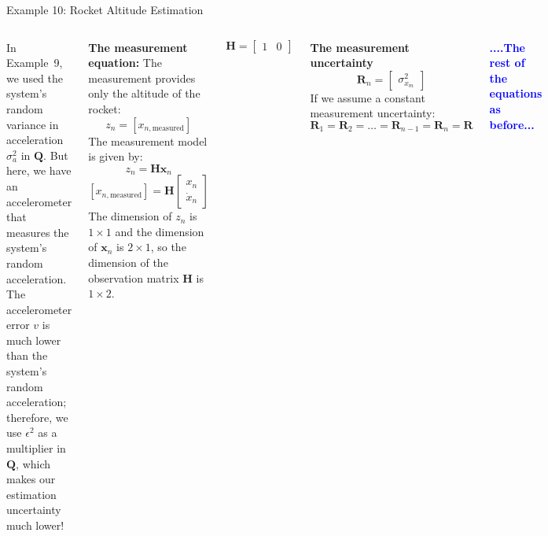 \begin{frame}{Example 10: Rocket Altitude Estimation}
\begin{columns}
In Example~9, we used the system’s random variance in acceleration $\sigma_a^2$ in $\mathbf{Q}$. But here, we have an accelerometer that
measures the system’s random acceleration. The accelerometer error $v$ is much lower
than the system’s random acceleration; therefore, we use $\epsilon^2$ as a multiplier in $\mathbf{Q}$, which makes our estimation uncertainty much lower!

\textbf{The measurement equation:}
The measurement provides only the altitude of the rocket:
\[
z_n = [x_{n,\text{measured}}]
\]
The measurement model is given by:
\[
z_n = \mathbf{H} \mathbf{x}_n
\]
\[
[x_{n,\text{measured}}] = \mathbf{H}
\begin{bmatrix}
x_n \\
\dot{x}_n
\end{bmatrix}
\]
The dimension of \( z_n \) is \( 1 \times 1 \) and the dimension of \( \mathbf{x}_n \) is \( 2 \times 1 \), so the dimension of the observation matrix \( \mathbf{H} \) is \( 1 \times 2 \).

\[
\mathbf{H} = \begin{bmatrix}
1 & 0
\end{bmatrix}
\]

\textbf{The measurement uncertainty}
        \[
        \mathbf{R}_n =
        \begin{bmatrix}
        \sigma^2_{x_m}
        \end{bmatrix}
        \]
        If we assume a constant measurement uncertainty:
        \[
        \mathbf{R}_1 = \mathbf{R}_2 = \ldots = \mathbf{R}_{n-1} = \mathbf{R}_n = \mathbf{R}
        \]
        
    \vspace{30pt}
    \textcolor{blue}{\textbf{....The rest of the equations as before...}}    
\end{columns}
\end{frame}   


